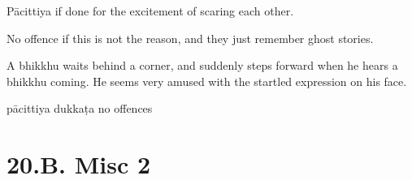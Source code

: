 \begin{exam}{\autoExamName}
\begin{problem*}
\begin{parts}
      \begin{solution}
        Pācittiya if done for the excitement of scaring each other.

        No offence if this is not the reason, and they just remember ghost stories.
      \end{solution}

      \bigskip

      \item A bhikkhu waits behind a corner, and suddenly steps forward when he
      hears a bhikkhu coming. He seems very amused with the startled expression
      on his face.

      \bigskip

      \begin{answers}{3}
        \bChoices
         pācittiya\eAns
         dukkaṭa\eAns
         no offences\eAns
        \eChoices
      \end{answers}

    \end{parts}

  \end{problem*}

\end{exam}

\chapter{20.B. Misc 2}
\renewcommand*{\theChapterTitle}{20.B. Misc 2}
